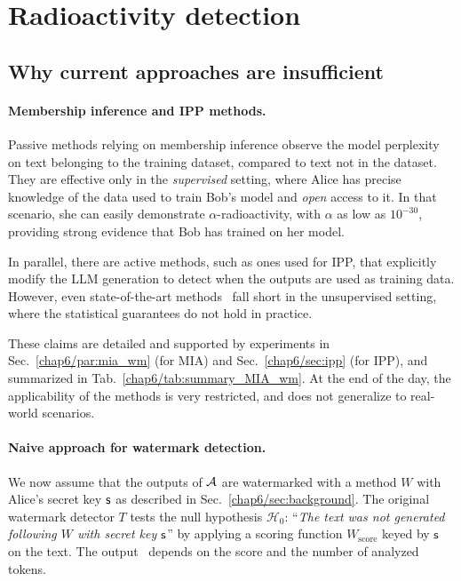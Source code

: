 \section{Radioactivity detection}\label{chap6/sec:radioactivity_detection}


\subsection{Why current approaches are insufficient}

\paragraph{Membership inference and IPP methods.} 

Passive methods relying on membership inference observe the model perplexity on text belonging to the training dataset, compared to text not in the dataset.
They are effective only in the \textit{supervised} setting, where Alice has precise knowledge of the data used to train Bob's model and \textit{open} access to it. 
In that scenario, she can easily demonstrate $\alpha$-radioactivity, with $\alpha$ as low as $10^{-30}$, providing strong evidence that Bob has trained on her model.

In parallel, there are active methods, such as ones used for IPP, that explicitly modify the LLM generation to detect when the outputs are used as training data.
However, even state-of-the-art methods~\citep{zhao2023protecting, he2022protecting, he2022cater} fall short in the unsupervised setting, where the statistical guarantees do not hold in practice.

These claims are detailed and supported by experiments in Sec.~\ref{chap6/par:mia_wm} (for MIA) and Sec.~\ref{chap6/sec:ipp} (for IPP), and summarized in Tab.~\ref{chap6/tab:summary_MIA_wm}.
At the end of the day, the applicability of the methods is very restricted, and does not generalize to real-world scenarios.

\paragraph{Naive approach for watermark detection.} 
We now assume that the outputs of $\mathcal A$ are watermarked with a method $W$ with Alice's secret key $\mathsf{s}$ as described in Sec.~\ref{chap6/sec:background}. 
The original watermark detector $T$ tests the null hypothesis $\mathcal{H}_0$: ``\textit{The text was not generated following $W$ with secret key $\mathsf{s}$}'' by applying a scoring function $W_{\textrm{score}}$ keyed by $\mathsf{s}$ on the text.
The output \pval\ depends on the score and the number of analyzed tokens.

